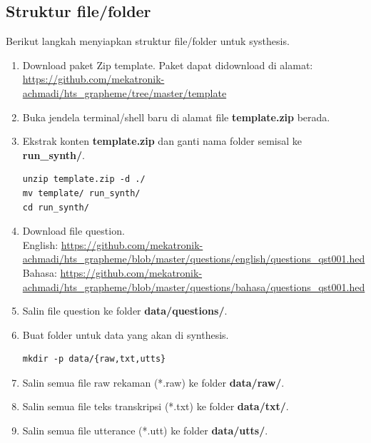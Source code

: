 \documentclass[12pt,]{article}
\begin{document}
	\subsection{Struktur file/folder}

	Berikut langkah menyiapkan struktur file/folder untuk systhesis.

	\begin{enumerate}
		\item Download paket Zip template.
		Paket dapat didownload di alamat:\\
		\url{https://github.com/mekatronik-achmadi/hts_grapheme/tree/master/template}

		\item Buka jendela terminal/shell baru di alamat file \textbf{template.zip} berada.


		\item Ekstrak konten \textbf{template.zip} dan ganti nama folder semisal ke \textbf{run\_synth/}.
		\begin{verbatim}
unzip template.zip -d ./
mv template/ run_synth/
cd run_synth/
		\end{verbatim}

		\item Download file question.\\
		English: \url{https://github.com/mekatronik-achmadi/hts_grapheme/blob/master/questions/english/questions_qst001.hed}\\
		Bahasa: \url{https://github.com/mekatronik-achmadi/hts_grapheme/blob/master/questions/bahasa/questions_qst001.hed}

		\item Salin file question ke folder \textbf{data/questions/}.

		\item Buat folder untuk data yang akan di synthesis.
		\begin{verbatim}
mkdir -p data/{raw,txt,utts}
		\end{verbatim}

		\item Salin semua file raw rekaman (*.raw) ke folder \textbf{data/raw/}.

		\item Salin semua file teks transkripsi (*.txt) ke folder \textbf{data/txt/}.

		\item Salin semua file utterance (*.utt) ke folder \textbf{data/utts/}.


\end{enumerate}
\end{document}
